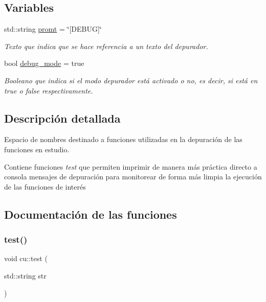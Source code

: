 \subsection*{Variables}
\begin{DoxyCompactItemize}
\item 
\mbox{\label{namespacecu_a67ef22d5c0f232da615812d7c61846a2}} 
std\+::string \hyperlink{namespacecu_a67ef22d5c0f232da615812d7c61846a2}{promt} = \char`\"{}\mbox{[}D\+E\+B\+UG\mbox{]}\char`\"{}
\begin{DoxyCompactList}\small\item\em Texto que indica que se hace referencia a un texto del depurador. \end{DoxyCompactList}\item 
\mbox{\label{namespacecu_ae84c5e905dd7b8c2b1b1194553f9c9a9}} 
bool \hyperlink{namespacecu_ae84c5e905dd7b8c2b1b1194553f9c9a9}{debug\+\_\+mode} = true
\begin{DoxyCompactList}\small\item\em Booleano que indica si el modo depurador está activado o no, es decir, si está en {\itshape true} o {\itshape false} respectivamente. \end{DoxyCompactList}\end{DoxyCompactItemize}


\subsection{Descripción detallada}
Espacio de nombres destinado a funciones utilizadas en la depuración de las funciones en estudio. 

Contiene funciones {\itshape test} que permiten imprimir de manera más práctica directo a consola mensajes de depuración para monitorear de forma más limpia la ejecución de las funciones de interés 

\subsection{Documentación de las funciones}
\mbox{\label{namespacecu_a2032e7d323896144cae02cca83ea7776}} 
\subsubsection{\texorpdfstring{test()}{test()}\hspace{0.1cm}{\footnotesize\ttfamily [1/6]}}
{\footnotesize\ttfamily void cu\+::test (\begin{DoxyParamCaption}\item[{std\+::string}]{str }\end{DoxyParamCaption})}



